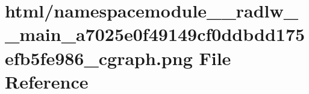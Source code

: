 \hypertarget{namespacemodule____radlw____main__a7025e0f49149cf0ddbdd175efb5fe986__cgraph_8png}{}\section{html/namespacemodule\+\_\+\+\_\+radlw\+\_\+\+\_\+main\+\_\+a7025e0f49149cf0ddbdd175efb5fe986\+\_\+cgraph.png File Reference}
\label{namespacemodule____radlw____main__a7025e0f49149cf0ddbdd175efb5fe986__cgraph_8png}

